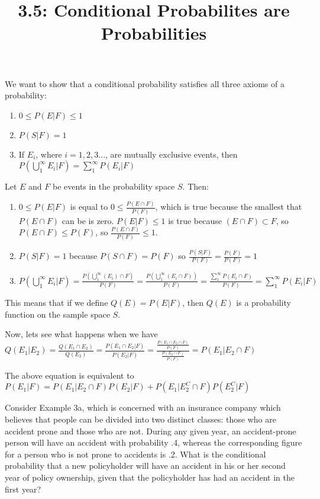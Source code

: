 \documentclass{article}
\title{3.5: Conditional Probabilites are Probabilities}
\begin{document}
\maketitle
\begin{proposition}
We want to show that a conditional probability satisfies all three axioms of a probability:
\begin{enumerate}
    \item $0 \leq P(E\vert F) \leq 1$
    \item $P(S\vert F) = 1$
    \item If $E_i$, where $i = 1,2,3...$, are mutually exclusive events, then $P(\bigcup_1^\infty E_i \vert F) = \sum_{1}^{\infty}P(E_i \vert F)$
\end{enumerate}
\end{proposition}

\begin{customproof}
Let $E$ and $F$ be events in the probability space $S$. Then:
\begin{enumerate}
    \item $0 \leq P(E\vert F)$ is equal to $0 \leq \frac{P(E\cap F)}{P(F)}$, which is true because the smallest that $P(E\cap F)$ can be is zero. $P(E \vert F) \leq 1$ is true because $(E \cap F) \subset F$, so $P(E\cap F) \leq P(F)$, so $\frac{P(E\cap F)}{P(F)} \leq 1$.
    \item $P(S\vert F) = 1$ because $P(S \cap F) = P(F)$ so $\frac{P(S\vert F)}{P(F)} = \frac{P(F)}{P(F)} = 1$
    \item $P(\bigcup_1^\infty E_i \vert F) = \frac{P(\bigcup_1^\infty (E_i) \cap F)}{P(F)} = \frac{P(\bigcup_1^\infty (E_i \cap F))}{P(F)} = \frac{\sum_{1}^{\infty}P(E_i \cap F)}{P(F)} = \sum_{1}^{\infty}P(E_i \vert F)$
\end{enumerate}
\end{customproof}

This means that if we define $Q(E) = P(E\vert F)$, then $Q(E)$ is a probability function on the sample space $S$.

Now, lets see what happens when we have $Q(E_1 \vert E_2) = \frac{Q(E_1 \cap E_2)}{Q(E_2)} = \frac{P(E_1 \cap E_2 \vert F)}{P(E_2 \vert F)} = \frac{\frac{P(E_1 \cap E_2 \cap F)}{P(F)}}{\frac{P(E_2 \cap F)}{P(F)}} = P(E_1 \vert E_2 \cap F)$

The above equation is equivalent to $P(E_1 \vert F) = P(E_1 \vert E_2\cap F)P(E_2 \vert F) + P(E_1 \vert E_2 ^C \cap F)P(E_2^C \vert F)$

\begin{example}[5a]
Consider Example 3a, which is concerned with an insurance company which believes that people can be divided into two distinct classes: those who are accident prone and those who are not. During any given year, an accident-prone person will have an accident with probability .4, whereas the corresponding figure for a person who is not prone to accidents is .2. What is the conditional probability that a new policyholder will have an accident in his or her second year of policy ownership, given that the policyholder has had an accident in the first year?
\end{example}
\end{document}
